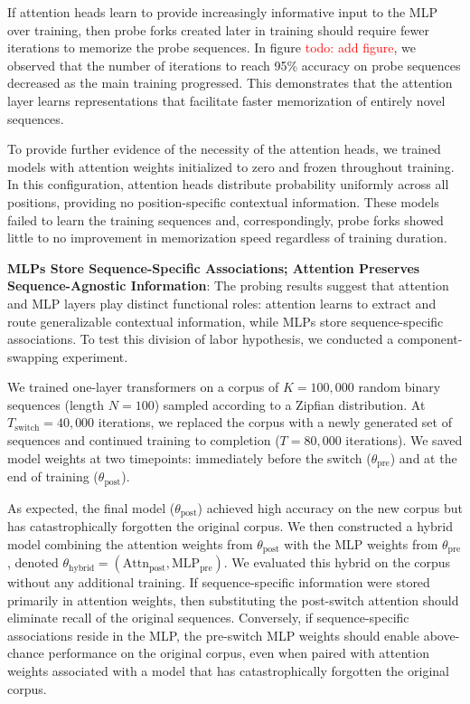 \documentclass{article}
\theoremstyle{plain}
\theoremstyle{definition}
\theoremstyle{remark}
\begin{document}
If attention heads learn to provide increasingly informative input to the MLP over training,
 then probe forks created later in training should require fewer iterations to memorize the probe sequences.
  In figure \textcolor{red}{todo: add figure}, 
  we observed that the number of iterations to reach 95\% accuracy on probe sequences decreased as the main training progressed. 
  This demonstrates that the attention layer learns representations that facilitate faster memorization of entirely novel sequences.

To provide further evidence of the necessity of the attention heads, 
we trained models with attention weights initialized to zero and frozen throughout training.
 In this configuration, attention heads distribute probability uniformly across all positions, 
 providing no position-specific contextual information. 
 These models failed to learn the training sequences and, 
 correspondingly, probe forks showed little to no improvement in memorization speed regardless of training duration.

\textbf{MLPs Store Sequence-Specific Associations; Attention Preserves Sequence-Agnostic Information}:
The probing results suggest that attention and MLP layers play distinct functional roles: 
attention learns to extract and route generalizable contextual information, 
while MLPs store sequence-specific associations. 
To test this division of labor hypothesis, we conducted a component-swapping experiment.

We trained one-layer transformers on a corpus of $K=100{,}000$ random binary sequences (length $N=100$)
sampled according to a Zipfian distribution.
 At $T_{\text{switch}}=40{,}000$ iterations, we replaced the corpus with a newly generated set of sequences 
 and continued training to completion ($T=80{,}000$ iterations). 
 We saved model weights at two timepoints: immediately before the switch ($\theta_{\text{pre}}$) 
 and at the end of training ($\theta_{\text{post}}$). 

As expected, the final model ($\theta_{\text{post}}$) achieved high accuracy on the new corpus but has catastrophically forgotten the original corpus.
 We then constructed a hybrid model combining the attention weights from $\theta_{\text{post}}$
  with the MLP weights from $\theta_{\text{pre}}$, denoted $\theta_{\text{hybrid}} = (\text{Attn}_{\text{post}}, \text{MLP}_{\text{pre}})$. 
We evaluated this hybrid on the \original corpus without any additional training.
If sequence-specific information were stored primarily in attention weights, 
then substituting the post-switch attention should eliminate recall of the original sequences.
 Conversely, if sequence-specific associations reside in the MLP,
  the pre-switch MLP weights should enable above-chance performance on the original corpus, 
  even when paired with attention weights associated with a 
  model that has catastrophically forgotten the original corpus.
\end{document}
